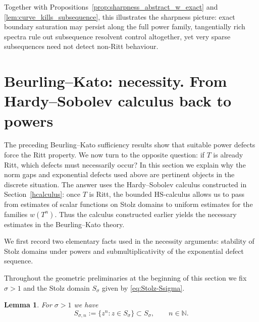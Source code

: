 \documentclass[11pt]{amsart}
\numberwithin{equation}{section}
\newtheorem{lemma}[theorem]{Lemma}
\theoremstyle{definition}
\theoremstyle{plain}
\def\N{\mathbb{N}}
\newcommand{\HS}{\mathrm{HS}}
\begin{document}

Together with Propositions~\ref{prop:sharpness_abstract_w_exact} and
\ref{lem:curve_kills_subsequence}, this illustrates the sharpness
picture: exact boundary saturation may persist along the full power
family, tangentially rich spectra rule out subsequence resolvent control
altogether, yet very sparse subsequences need not detect non-Ritt
behaviour.

\section{Beurling--Kato: necessity. From Hardy--Sobolev calculus back to powers}\label{sec:HS-back-powers}


The preceding Beurling--Kato sufficiency results show that suitable
power
defects force the Ritt property.  We now turn to the opposite
question: if \(T\) is already Ritt, which defects must necessarily occur?
In this section  we explain why
the norm gaps and exponential defects used above are 
pertinent objects in the discrete situation.  The answer uses the Hardy--Sobolev calculus constructed in
Section~\ref{hcalculus}: once \(T\) is Ritt, the bounded \(\HS\)-calculus allows us to pass
from estimates of scalar functions on Stolz domains to uniform estimates
for the families \(w(T^n)\).  
Thus the calculus constructed earlier yields the necessary estimates in the Beurling--Kato theory.




We first record two elementary facts used in the necessity arguments:
stability of Stolz domains under powers and submultiplicativity of the
exponential defect sequence.

Throughout the geometric preliminaries at the beginning of this section we fix $\sigma>1$ and the Stolz domain
$S_\sigma$ given by \eqref{eq:Stolz-Ssigma}.

\begin{lemma}\label{lem:Stolz-union-compact}
For $\sigma>1$ we have
\[
   S_{\sigma,n} := \{z^n : z\in S_\sigma\}\subset S_\sigma, \qquad n\in \N.
\]
\end{lemma}
\end{document}
